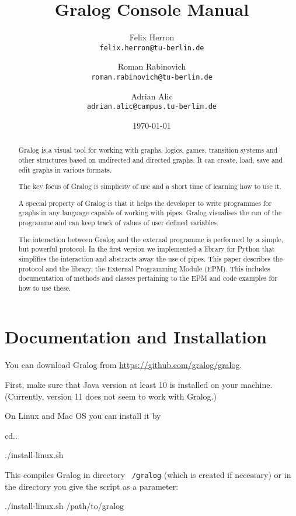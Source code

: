 \documentclass{article}
\title{Gralog Console Manual}
\author{Felix Herron\\\texttt{felix.herron@tu-berlin.de}
  \and Roman Rabinovich\\ \texttt{roman.rabinovich@tu-berlin.de}
\and Adrian Alic\\ \texttt{adrian.alic@campus.tu-berlin.de}}
\date{\today}
\newcounter{example}
\begin{document}
\maketitle


\begin{abstract}
Gralog is a visual tool for working with graphs, logics, games,
transition systems and other structures based on undirected and
directed graphs. It can create, load, save and edit graphs in
various formats.

The key focus of Gralog is simplicity of use and a short time of
learning how to use it.

A special property of Gralog is that it helps the developer to write
programmes for graphs in any language capable of working with
pipes. Gralog visualises the run of the programme and can keep track
of values of user defined variables.

The interaction between Gralog and the external programme is
performed by a simple, but powerful protocol. In the first version
we implemented a library for Python that simplifies the interaction
and abstracts away the use of pipes. This paper describes the
protocol and the library, the External Programming Module (EPM). This
includes documentation of methods and classes pertaining to the
EPM and code examples for how to use these.
\end{abstract}

\section{Documentation and Installation}

You can download Gralog from \url{https://github.com/gralog/gralog}.

First, make sure that Java version at least 10 is installed on your
machine. (Currently, version 11 does not seem to work with Gralog.)

On Linux and Mac OS you can install it by

\begin{tcolorbox}
  cd..

  ./install-linux.sh
\end{tcolorbox}

This compiles Gralog in directory \texttt{~/gralog} (which is created
if necessary) or in the directory you give the script as a parameter:

\begin{tcolorbox}
  ./install-linux.sh /path/to/gralog
\end{tcolorbox}
\end{document}
